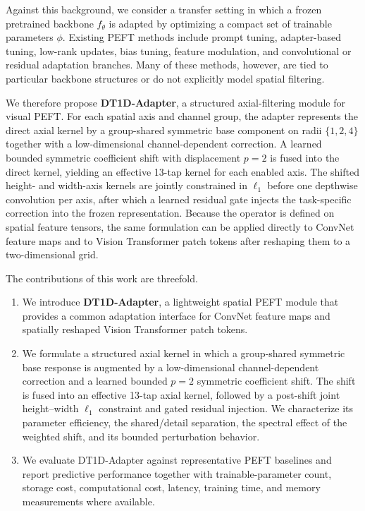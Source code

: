 \documentclass[pdflatex,sn-mathphys-num]{sn-jnl}
\theoremstyle{thmstyleone}
\theoremstyle{thmstyletwo}
\theoremstyle{thmstylethree}
\begin{document}
Against this background, we consider a transfer setting in which a frozen pretrained backbone $f_{\theta}$ is adapted by optimizing a compact set of trainable parameters $\phi$. Existing PEFT methods include prompt tuning, adapter-based tuning, low-rank updates, bias tuning, feature modulation, and convolutional or residual adaptation branches. Many of these methods, however, are tied to particular backbone structures or do not explicitly model spatial filtering.

We therefore propose \textbf{DT1D-Adapter}, a structured axial-filtering module for visual PEFT. For each spatial axis and channel group, the adapter represents the direct axial kernel by a group-shared symmetric base component on radii $\{1,2,4\}$ together with a low-dimensional channel-dependent correction. A learned bounded symmetric coefficient shift with displacement $p=2$ is fused into the direct kernel, yielding an effective 13-tap kernel for each enabled axis. The shifted height- and width-axis kernels are jointly constrained in $\ell_1$ before one depthwise convolution per axis, after which a learned residual gate injects the task-specific correction into the frozen representation. Because the operator is defined on spatial feature tensors, the same formulation can be applied directly to ConvNet feature maps and to Vision Transformer patch tokens after reshaping them to a two-dimensional grid.

The contributions of this work are threefold.
\begin{enumerate}
\item We introduce \textbf{DT1D-Adapter}, a lightweight spatial PEFT module that provides a common adaptation interface for ConvNet feature maps and spatially reshaped Vision Transformer patch tokens.
\item We formulate a structured axial kernel in which a group-shared symmetric base response is augmented by a low-dimensional channel-dependent correction and a learned bounded $p=2$ symmetric coefficient shift. The shift is fused into an effective 13-tap axial kernel, followed by a post-shift joint height--width $\ell_1$ constraint and gated residual injection. We characterize its parameter efficiency, the shared/detail separation, the spectral effect of the weighted shift, and its bounded perturbation behavior.
\item We evaluate DT1D-Adapter against representative PEFT baselines and report predictive performance together with trainable-parameter count, storage cost, computational cost, latency, training time, and memory measurements where available.
\end{enumerate}
\end{document}
